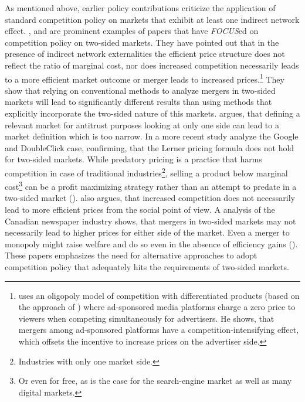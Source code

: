 \documentclass[10pt,a4paper]{scrreprt}
\begin{document}
As mentioned above, earlier policy contributions criticize the application of standard competition policy on markets that exhibit at least one indirect network effect. \cite{evans_antitrust_2003}, \cite{evans_industrial_2007} \cite{wright_one-sided_2004} and \cite{kaiser_price_2006} are prominent examples of papers that have \textit{FOCUS}ed on competition policy on two-sided markets. They have pointed out that in the presence of indirect network externalities the efficient price structure does not reflect the ratio of marginal cost, nor does increased competition necessarily leads to a more efficient market outcome or merger leads to increased prices.\footnote{\cite{malam_mergers_2011} uses an oligopoly model of competition with differentiated products (based on the approach of \cite{salop_monopolistic_1979}) where ad-sponsored media platforms charge a zero price to viewers when competing simultaneously for advertisers. He shows, that mergers among ad-sponsored platforms have a competition-intensifying effect, which offsets the incentive to increase prices on the advertiser side.} They show that relying on conventional methods to analyze mergers in two-sided markets will lead to significantly different results than using methods that explicitly incorporate the two-sided nature of this markets. \cite{evans_antitrust_2003} argues, that defining a relevant market for antitrust purposes looking at only one side can lead to a market definition which is too narrow. In a more recent study \cite{evans_analysis_2008} analyze the Google and DoubleClick case, confirming, that the Lerner pricing formula does not hold for two-sided markets. While predatory pricing is a practice that harms competition in case of traditional industries\footnote{Industries with only one market side.}, selling a product below marginal cost\footnote{Or even for free, as is the case for the search-engine market as well as many digital markets.} can be a profit maximizing strategy rather than an attempt to predate in a two-sided market (\cite{wright_one-sided_2004}). \cite{wright_one-sided_2004} also argues, that increased competition does not necessarily lead to more efficient prices from the social point of view. A analysis of the Canadian newspaper industry shows, that mergers in two-sided markets may not necessarily lead to higher prices for either side of the market. Even a merger to monopoly might raise welfare and do so even in the absence of efficiency gains (\cite{leonello_horizontal_2010}). These papers emphasizes  the need for alternative approaches to adopt competition policy that adequately hits the requirements of two-sided markets. 
\end{document}
